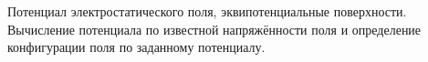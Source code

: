 \documentclass[__main__.tex]{subfiles}
\begin{document}
Потенциал электростатического поля, эквипотенциальные поверхности. Вычисление потенциала по известной напряжённости поля и определение конфигурации поля по заданному потенциалу.\\ 

\end{document}
